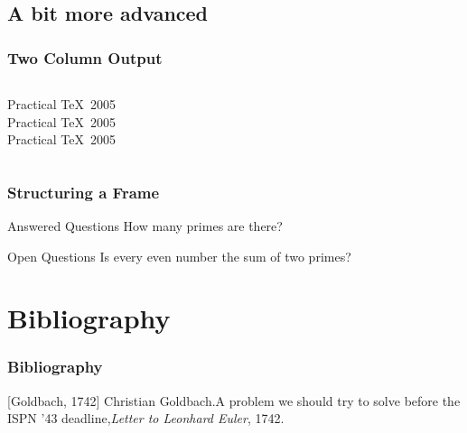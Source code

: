 \documentclass{beamer}
\begin{document}
\subsection{A bit more advanced}
\begin{frame}
  \frametitle{Two Column Output}
  \begin{columns}[c]
  \column{1.5in}
    Practical \TeX\ 2005\\
    Practical \TeX\ 2005\\
    Practical \TeX\ 2005
    
  \column{1.5in}
  \end{columns}
\end{frame}

\begin{frame}
  \frametitle{Structuring a Frame}

  \begin{block}{Answered Questions}
    How many primes are there?
  \end{block}
  
  \begin{block}{Open Questions}
    Is every even number the sum of two primes?
    \cite{Goldbach1742}
  \end{block}

  \end{frame}
  
\section*{Bibliography}
\begin{frame}
  \frametitle{Bibliography}
   \begin{thebibliography}{10}
    [Goldbach, 1742] Christian Goldbach.\newblock A problem we should try to solve before the ISPN '43 deadline,\newblock \emph{Letter to Leonhard Euler}, 1742.
    \end{thebibliography} 
\end{frame}  
\end{document}
